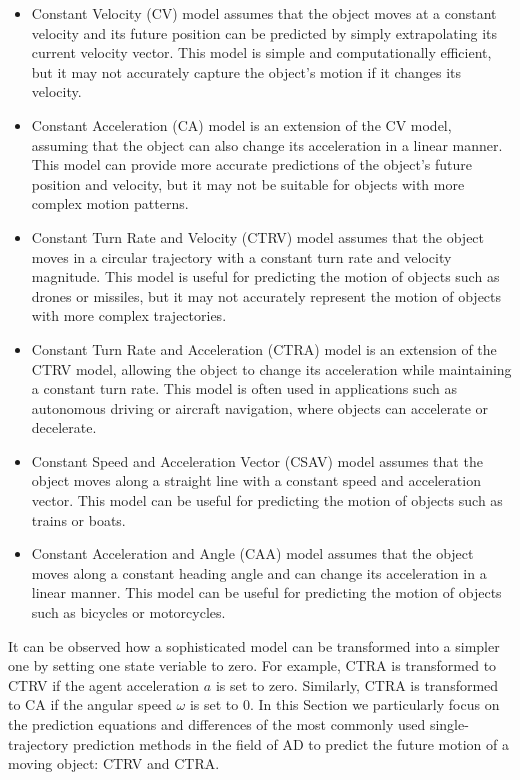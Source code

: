 \begin{itemize}
	\item Constant Velocity (CV) model assumes that the object moves at a constant velocity and its future position can be predicted by simply extrapolating its current velocity vector. This model is simple and computationally efficient, but it may not accurately capture the object's motion if it changes its velocity.
	\item Constant Acceleration (CA) model is an extension of the CV model, assuming that the object can also change its acceleration in a linear manner. This model can provide more accurate predictions of the object's future position and velocity, but it may not be suitable for objects with more complex motion patterns.
	\item Constant Turn Rate and Velocity (CTRV) model assumes that the object moves in a circular trajectory with a constant turn rate and velocity magnitude. This model is useful for predicting the motion of objects such as drones or missiles, but it may not accurately represent the motion of objects with more complex trajectories.
	\item Constant Turn Rate and Acceleration (CTRA) model is an extension of the CTRV model, allowing the object to change its acceleration while maintaining a constant turn rate. This model is often used in applications such as autonomous driving or aircraft navigation, where objects can accelerate or decelerate.
	\item Constant Speed and Acceleration Vector (CSAV) model assumes that the object moves along a straight line with a constant speed and acceleration vector. This model can be useful for predicting the motion of objects such as trains or boats.
	\item Constant Acceleration and Angle (CAA) model assumes that the object moves along a constant heading angle and can change its acceleration in a linear manner. This model can be useful for predicting the motion of objects such as bicycles or motorcycles.
\end{itemize}

It can be observed how a sophisticated model can be transformed into a simpler one by setting one state veriable to zero. For example, CTRA is transformed to CTRV if the agent acceleration $a$ is set to zero. Similarly, CTRA is transformed to CA if the angular speed $\omega$ is set to 0. In this Section we particularly focus on the prediction equations and differences of the most commonly used single-trajectory prediction methods in the field of \ac{AD} to predict the future motion of a moving object: CTRV and CTRA.

